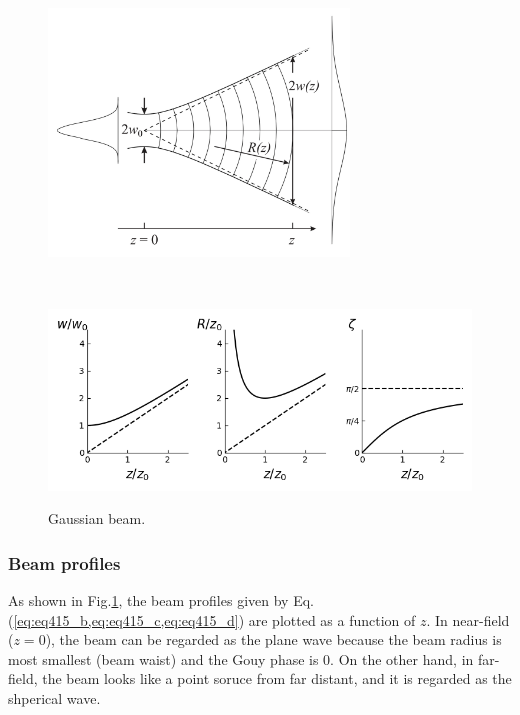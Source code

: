\begin{figure}[p]
  \begin{minipage}{14cm}
    \centering    
    \includegraphics[width=8cm]{./img_chap4/img415a.png}
    \label{img:img415a}
  \end{minipage}\\
  \begin{minipage}{14cm}
    \centering        
    \includegraphics[width=14cm]{./img_chap4/img415.png}
    \label{img:img415}    
  \end{minipage}
  \caption{Gaussian beam.}
\end{figure}

\subsubsection{Beam profiles}
As shown in Fig.\ref{img:img415}, the beam profiles given by Eq.(\ref{eq:eq415_b,eq:eq415_c,eq:eq415_d}) are plotted as a function of $z$. In near-field ($z=0$), the beam can be regarded as the plane wave because the beam radius is most smallest (beam waist) and the Gouy phase is 0. On the other hand, in far-field, the beam looks like a point soruce from far distant, and it is regarded as the shperical wave.

